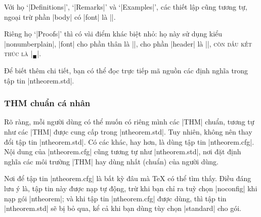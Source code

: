 Với họ `|Definitions|', `|Remarks|' và `|Examples|', các thiết lập cũng
tương tự, ngoại trừ phần |body| có |font|  là |\upshape|.

\medskip
Riêng họ `|Proofs|' thì có vài điểm khác biệt nhỏ: họ này sử dụng
kiểu |nonumberplain|, |font| cho phần thân là |\upshape|,
cho phần |header| là |\scshape|, còn dấu kết thúc là |\ensuremath{_\blacksquare}|.

\medskip
Để biết thêm chi tiết, bạn có thể đọc trực tiếp mã nguồn
các định nghĩa trong tập tin |ntheorem.std|.

\subsubsection{\texorpdfstring{THM chuẩn cá nhân}{THM chuan ca nhan}}
\label{sec:private.thm}

Rõ ràng, mỗi người dùng có thể muốn có riêng mình các |THM|
chuẩn, tương tự như các |THM| được cung cấp trong |ntheorem.std|.
Tuy nhiên, không nên thay đổi tập tin |ntheorem.std|.
Có các khác, hay hơn, là dùng tập tin |ntheorem.cfg|.
Nội dung của |ntheorem.cfg| cũng tương tự như |ntheorem.std|,
nơi đặt định nghĩa các môi trường |THM| hay dùng nhất (chuẩn)
của người dùng.

\medskip
Nơi để tập tin |ntheorem.cfg| là bất kỳ đâu mà \TeX{} có thể tìm
thấy. Điều đáng lưu ý là, tập tin này được nạp tự động,
trừ khi bạn chỉ ra tuỳ chọn |noconfig| khi nạp gói |ntheorem|;
và khi tập tin |ntheorem.cfg| được dùng, thì tập tin |ntheorem.std|
sẽ bị bỏ qua, kể cả khi bạn dùng tùy chọn |standard| cho gói.

